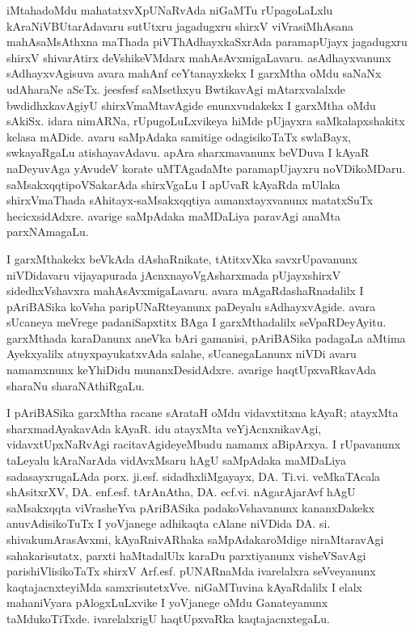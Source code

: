 iMtahadoMdu mahatatxvXpUNaRvAda niGaMTu rUpagoLaLxlu kAraNiVBUtarAdavaru sutUtxru jagadugxru shirxV viVrasiMhAsana mahAsaMsAthxna maThada piVThAdhayxkaSxrAda paramapUjayx jagadugxru shirxV shivarAtirx deVshikeVMdarx mahAsAvxmigaLavaru. asAdhayxvanunx sAdhayx\-vAgisuva avara mahAnf ceYtanayxkekx I garxMtha oMdu saNaNx udAharaNe aSeTx. jeesfesf saMsethxyu BwtikavAgi mAtarxvalalxde bwdidhxka\-vAgiyU shirxVmaMtavAgide enunxvudakekx I garxMtha oMdu sAkiSx. idara nimARNa, rUpugoLuLxvikeya hiMde pUjayxra saMkalapxshakitx kelasa mADide. avaru saMpAdaka samitige odagisikoTaTx swlaBayx, swkayaRgaLu atishayavAdavu. apAra sharxmavanunx beVDuva I kAyaR naDeyuvAga yAvudeV korate uMTAgadaMte paramapUjayxru noVDikoMDaru. saMsakxqqtipoVSakarAda shirxVgaLu I apUvaR kAyaRda mUlaka shirxVmaThada sAhitayx-saMsakxqqtiya aunanxtayxvanunx matatxSuTx hecicxsidAdxre. avarige saMpAdaka maMDaLiya paravAgi anaMta parxNAmagaLu.

\smallskip

I garxMthakekx beVkAda dAshaRnikate, tAtitxvXka savxrUpavanunx niVDidavaru vijayapurada jAcnxnayoVgAsharxmada pUjayx\break shirxV sidedhxVshavxra mahAsAvxmigaLavaru. avara mAgaRdashaRnadalilx I pAriBASika koVsha paripUNaRteyanunx paDeyalu sAdhayxvAgide. avara sUcaneya meVrege padaniSapxtitx BAga I garxMthadalilx seVpaRDeyAyitu.  garxMthada karaDanunx aneVka bAri gamanisi, pAriBASika padagaLa aMtima Ayekxyalilx atuyxpa\-yukatxvAda salahe, sUcanegaLanunx niVDi avaru namamxnunx keYhiDidu munanxDesidAdxre. avarige haqtUpxvaRkavAda sharaNu sharaNAthiRgaLu.

\smallskip

I pAriBASika garxMtha racane sArataH oMdu vidavxtitxna kAyaR; atayxMta sharxmadAyakavAda kAyaR. idu atayxMta veYjAcnxnikavAgi, vidavxtUpxNaRvAgi racitavAgideyeMbudu namamx aBipArxya. I rUpavanunx taLeyalu kAraNarAda vidAvxMsaru hAgU saMpAdaka maMDaLiya sadasayxrugaLAda porx. ji.esf. sidadhxliMgayayx, DA. Ti.vi. veMkaTAcala shAsitxrXV, DA. enf.esf. tArAnAtha, DA. ecf.vi. nAgarAjarAvf hAgU saMsakxqqta \hbox{viVrasheYva} pAri\-BASika padakoVshavanunx kananxDakekx anuvAdisikoTuTx I yoVjanege adhikaqta cAlane niVDida DA. si. shivakumArasAvxmi, kAyaRnivARhaka saMpAdakaroMdige niraMtaravAgi sahakarisutatx, parxti haMtadalUlx karaDu parxtiyanunx visheVSavAgi parishiVlisikoTaTx shirxV Arf.esf. pUNARnaMda ivarelalxra seVveyanunx kaqtajacnxteyiMda samxrisutetxVve. niGaMTuvina kAyaRdalilx I elalx mahaniVyara pAlogxLuLxvike I yoVjanege oMdu Ganateyanunx taMdu\-koTiTxde. ivarelalxrigU haqtUpxvaRka kaqtajacnxtegaLu.

